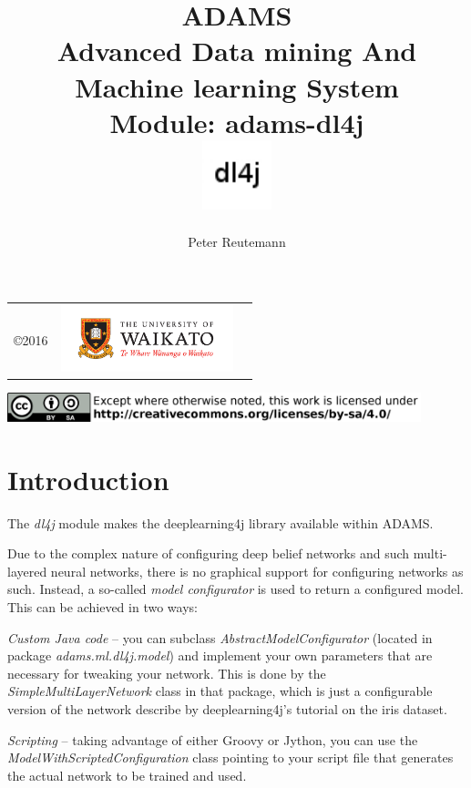 \documentclass[a4paper]{book}
\title{
  \textbf{ADAMS} \\
  {\Large \textbf{A}dvanced \textbf{D}ata mining \textbf{A}nd \textbf{M}achine
  learning \textbf{S}ystem} \\
  {\Large Module: adams-dl4j} \\
  \vspace{1cm}
  \includegraphics[width=2cm]{images/dl4j-module.png} \\
}
\author{
  Peter Reutemann
}
\begin{document}
\begin{titlepage}
\maketitle

\thispagestyle{empty}
\center
\begin{table}[b]
	\begin{tabular}{c l l}
		\parbox[c][2cm]{2cm}{\copyright 2016} &
		\parbox[c][2cm]{5cm}{\includegraphics[width=5cm]{images/coat_of_arms.pdf}} \\
	\end{tabular}
	\includegraphics[width=12cm]{images/cc.png} \\
\end{table}

\end{titlepage}

\tableofcontents

\chapter{Introduction}
The \textit{dl4j} module makes the deeplearning4j\cite{dl4j} library available
within ADAMS.

Due to the complex nature of configuring deep belief networks and such
multi-layered neural networks, there is no graphical support for configuring
networks as such. Instead, a so-called \textit{model configurator} is used
to return a configured model. This can be achieved in two ways:
\begin{tight_itemize}
  \item \textit{Custom Java code} -- you can subclass
  \textit{AbstractModelConfigurator} (located in package \textit{adams.ml.dl4j.model})
  and implement your own parameters that are necessary for tweaking your network. This is
  done by the \textit{SimpleMultiLayerNetwork} class in that package, which
  is just a configurable version of the network describe by deeplearning4j's
  tutorial on the iris dataset.
  \item \textit{Scripting} -- taking advantage of either Groovy or Jython,
  you can use the \textit{ModelWithScriptedConfiguration} class pointing
  to your script file that generates the actual network to be trained and used.
\end{tight_itemize}
\end{document}
